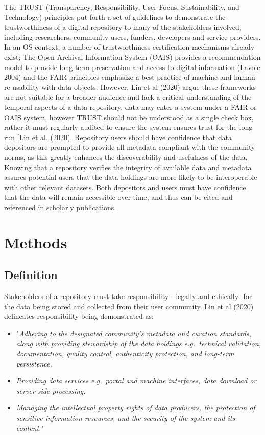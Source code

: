\documentclass{article}
\begin{document}
The TRUST (Transparency, Responsibility, User Focus, Sustainability, and
Technology) principles put forth a set of guidelines to demonstrate the
trustworthiness of a digital repository to many of the stakeholders
involved, including researchers, community users, funders, developers
and service providers. In an OS context, a number of trustworthiness
certification mechanisms already exist; The Open Archival Information
System (OAIS) provides a recommendation model to provide long-term
preservation and access to digital information (Lavoie 2004) and the
FAIR principles emphasize a best practice of machine and human
re-usability with data objects. However, Lin et al (2020) argue these
frameworks are not suitable for a broader audience and lack a critical
understanding of the temporal aspects of a data repository, data may
enter a system under a FAIR or OAIS system, however TRUST should not be
understood as a single check box, rather it must regularly audited to
ensure the system ensures trust for the long run {[}Lin et al. (2020).
Repository users should have confidence that data depositors are
prompted to provide all metadata compliant with the community norms, as
this greatly enhances the discoverability and usefulness of the data.
Knowing that a repository verifies the integrity of available data and
metadata assures potential users that the data holdings are more likely
to be interoperable with other relevant datasets. Both depositors and
users must have confidence that the data will remain accessible over
time, and thus can be cited and referenced in scholarly publications.

\hypertarget{methods}{%
\section{Methods}\label{methods}}

\hypertarget{definition}{%
\subsection{Definition}\label{definition}}

Stakeholders of a repository must take responsibility - legally and
ethically- for the data being stored and collected from their user
community. Lin et al (2020) delineates responsibility being demonstrated
as:

\begin{itemize}
\item
  "\emph{Adhering to the designated community's metadata and curation
  standards, along with providing stewardship of the data holdings
  e.g.~technical validation, documentation, quality control,
  authenticity protection, and long-term persistence.}
\item
  \emph{Providing data services e.g.~portal and machine interfaces, data
  download or server-side processing.}
\item
  \emph{Managing the intellectual property rights of data producers, the
  protection of sensitive information resources, and the security of the
  system and its content.}"
\end{itemize}
\end{document}
